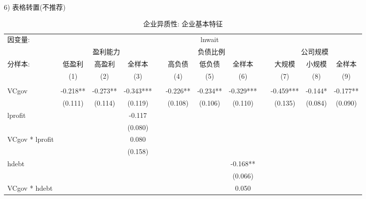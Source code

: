 \documentclass{setp-new}
\begin{document}
6) 表格转置(不推荐)
\begin{landscape}
\begin{table}[h]
\centering
\caption{企业异质性: 企业基本特征}
\label{tab11}
\tabcolsep 9pt
    \begin{tabular}{p{2.5cm}<{\raggedright} ccccccccccc}
    \toprule
    因变量:   & \multicolumn{11}{c}{lnwait} \\
\cmidrule{2-12}          & \multicolumn{3}{c}{盈利能力} &       & \multicolumn{3}{c}{负债比例} &       & \multicolumn{3}{c}{公司规模} \\
\cmidrule{2-4}\cmidrule{6-8}\cmidrule{10-12}    分样本:   & 低盈利   & 高盈利   & 全样本   &       & 高负债   & 低负债   & 全样本   &       & 大规模   & 小规模   & 全样本 \\
\cmidrule{2-4}\cmidrule{6-8}\cmidrule{10-12}          & (1)   & (2)   & (3)   &       & (4)   & (5)   & (6)   &       & (7)   & (8)   & (9) \\
    \midrule
          &       &       &       &       &       &       &       &       &       &       &  \\
    VCgov & -0.218** & -0.273** & -0.343*** &       & -0.226** & -0.234** & -0.329*** &       & -0.459*** & -0.144* & -0.177** \\
          & (0.111) & (0.114) & (0.119) &       & (0.108) & (0.106) & (0.110) &       & (0.135) & (0.084) & (0.090) \\
    lprofit &       &       & -0.117 &       &       &       & \multicolumn{1}{l}{} &       &       &       & \multicolumn{1}{l}{} \\
          &       &       & (0.080) &       &       &       & \multicolumn{1}{l}{} &       &       &       & \multicolumn{1}{l}{} \\
    VCgov * lprofit &       &       & 0.080 &       &       &       & \multicolumn{1}{l}{} &       &       &       & \multicolumn{1}{l}{} \\
          &       &       & (0.158) &       &       &       & \multicolumn{1}{l}{} &       &       &       & \multicolumn{1}{l}{} \\
   hdebt &       &       &       &       &       &       & -0.168** &       &       &       & \multicolumn{1}{l}{} \\
          &       &       &       &       &       &       & (0.066) &       &       &       & \multicolumn{1}{l}{} \\
  VCgov * hdebt &       &       &       &       &       &       & 0.050 &       &       &       & \multicolumn{1}{l}{} \\

\end{tabular}
\end{table}
\end{landscape}
\end{document}
